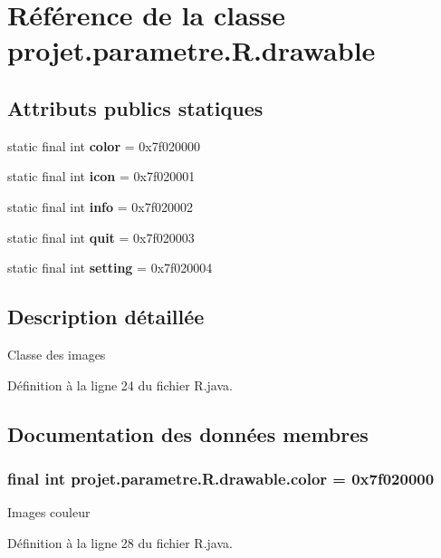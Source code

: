 \section{\-Référence de la classe projet.\-parametre.\-R.\-drawable}
\label{classprojet_1_1parametre_1_1_r_1_1drawable}
\subsection*{\-Attributs publics statiques}
\begin{DoxyCompactItemize}
\item 
static final int {\bf color} = 0x7f020000
\item 
static final int {\bf icon} = 0x7f020001
\item 
static final int {\bf info} = 0x7f020002
\item 
static final int {\bf quit} = 0x7f020003
\item 
static final int {\bf setting} = 0x7f020004
\end{DoxyCompactItemize}


\subsection{\-Description détaillée}
\-Classe des images 

\-Définition à la ligne 24 du fichier \-R.\-java.



\subsection{\-Documentation des données membres}
\subsubsection[{color}]{\setlength{\rightskip}{0pt plus 5cm}final int {\bf projet.\-parametre.\-R.\-drawable.\-color} = 0x7f020000\hspace{0.3cm}{\ttfamily  [static]}}\label{classprojet_1_1parametre_1_1_r_1_1drawable_a9b1d535e7479ce6d0e8eff375bcbf0ee}
\-Images couleur 

\-Définition à la ligne 28 du fichier \-R.\-java.


